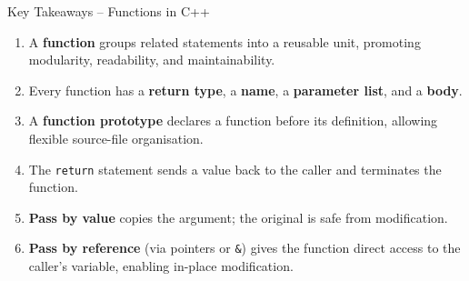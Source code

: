 \begin{importantbox}{Key Takeaways -- Functions in C++}
\begin{enumerate}
    \item A \textbf{function} groups related statements into a reusable unit,
          promoting modularity, readability, and maintainability.
    \item Every function has a \textbf{return type}, a \textbf{name}, a
          \textbf{parameter list}, and a \textbf{body}.
    \item A \textbf{function prototype} declares a function before its
          definition, allowing flexible source-file organisation.
    \item The \texttt{return} statement sends a value back to the caller
          and terminates the function.
    \item \textbf{Pass by value} copies the argument; the original is safe
          from modification.
    \item \textbf{Pass by reference} (via pointers or \texttt{\&}) gives the
          function direct access to the caller's variable, enabling in-place
          modification.
\end{enumerate}
\end{importantbox}
